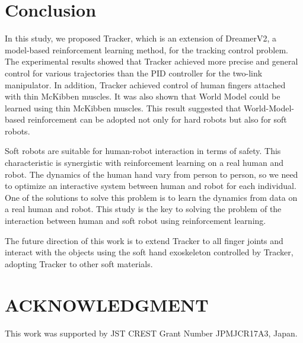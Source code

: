 \documentclass[letterpaper, 10 pt, conference]{ieeeconf}  %
\begin{document}
\section{Conclusion}
In this study, we proposed Tracker, which is an extension of DreamerV2, a model-based reinforcement learning method, for the tracking control problem. 
The experimental results showed that Tracker achieved more precise and general control for various trajectories than the PID controller for the two-link manipulator. In addition, Tracker achieved control of human fingers attached with thin McKibben muscles. 
It was also shown that World Model could be learned using thin McKibben muscles. This result suggested that World-Model-based reinforcement can be adopted not only for hard robots but also for soft robots.

Soft robots are suitable for human-robot interaction in terms of safety. This characteristic is synergistic with reinforcement learning on a real human and robot. The dynamics of the human hand vary from person to person, so we need to optimize an interactive system between human and robot for each individual. One of the solutions to solve this problem is to learn the dynamics from data on a real human and robot. This study is the key to solving the problem of the interaction between human and soft robot using reinforcement learning. 

The future direction of this work is to extend Tracker to all finger joints and interact with the objects using the soft hand exoskeleton controlled by Tracker, adopting Tracker to other soft materials.

\addtolength{\textheight}{-12cm}   %








\section*{ACKNOWLEDGMENT}
This work was supported by JST CREST Grant Number JPMJCR17A3, Japan.




\end{document}
